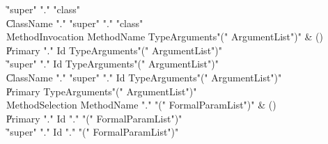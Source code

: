 \begin{bbgrammar}
    \| \xcd"super" \xcd"." \xcd"class" \\
    \| ClassName \xcd"." \xcd"super"  \xcd"." \xcd"class" \\
 MethodInvocation  \label{prod:MethodInvocation}  \: MethodName TypeArguments\opt \xcd"(" ArgumentList\opt \xcd")" & ()\\
    \| Primary \xcd"." Id TypeArguments\opt \xcd"(" ArgumentList\opt \xcd")"\\
    \| \xcd"super" \xcd"." Id TypeArguments\opt \xcd"(" ArgumentList\opt \xcd")"\\
    \| ClassName \xcd"." \xcd"super"  \xcd"." Id TypeArguments\opt \xcd"(" ArgumentList\opt \xcd")"\\
    \| Primary TypeArguments\opt \xcd"(" ArgumentList\opt \xcd")"\\
 MethodSelection  \label{prod:MethodSelection}  \: MethodName \xcd"." \xcd"(" FormalParamList\opt \xcd")" & ()\\
    \| Primary \xcd"." Id \xcd"." \xcd"(" FormalParamList\opt \xcd")"\\
    \| \xcd"super" \xcd"." Id \xcd"." \xcd"(" FormalParamList\opt \xcd")"\\
\end{bbgrammar}

